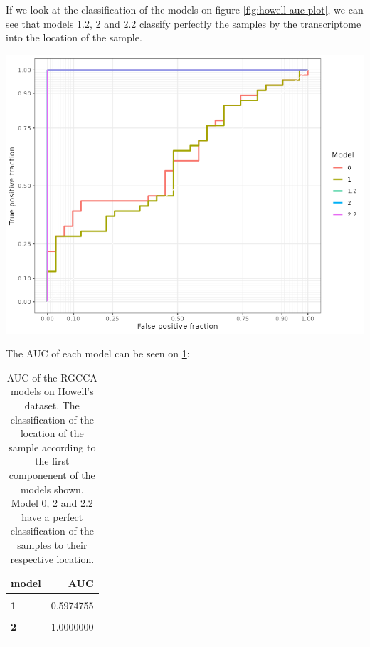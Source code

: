 \documentclass[
  a4paper,
]{book}
\let\origfigure\figure
\let\endorigfigure\endfigure
\renewenvironment{figure}[1][2] {
    \expandafter\origfigure\expandafter[!ht]
} {
    \endorigfigure
}
\begin{document}
If we look at the classification of the models on figure \ref{fig:howell-auc-plot}, we can see that models 1.2, 2 and 2.2 classify perfectly the samples by the transcriptome into the location of the sample.

\begin{figure}
\includegraphics[width=1\linewidth]{images/howell-rgcca-auc} \caption[AUC of the RGCCA models on Howell's dataset.]{AUC of the RGCCA models on Howell's dataset. The classification of the location of the sample according to the first componenent of the models shown.}\label{fig:howell-auc-plot}
\end{figure}

The AUC of each model can be seen on \ref{tab:howell-auc}:

\begin{table}[H]

\caption[AUC of the RGCCA models on Howell's dataset]{\label{tab:howell-auc}AUC of the RGCCA models on Howell's dataset. The classification of the location of the sample according to the first componenent of the models shown. Model 0, 2 and 2.2 have a perfect classification of the samples to their respective location.}
\centering
\begin{tabular}[t]{>{}l||r}
\hline
model & AUC\\
\hline
\textbf{\cellcolor{gray!6}{0}} & \cellcolor{gray!6}{0.6255259}\\
\hline
\textbf{1} & 0.5974755\\
\hline
\textbf{\cellcolor{gray!6}{1.2}} & \cellcolor{gray!6}{1.0000000}\\
\hline
\textbf{2} & 1.0000000\\
\hline
\textbf{\cellcolor{gray!6}{2.2}} & \cellcolor{gray!6}{1.0000000}\\
\hline
\end{tabular}
\end{table}
\end{document}

